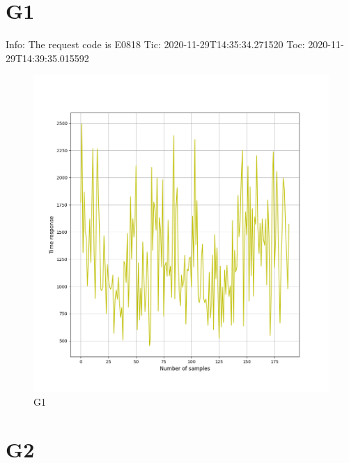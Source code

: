 \documentclass[hidelinks, 12pt, a4paper]{article}
\begin{document}



\pagebreak
\tableofcontents
\pagebreak



\section{G1}

Info:
The request code is E0818 
Tic: 2020-11-29T14:35:34.271520
Toc: 2020-11-29T14:39:35.015592

\begin{figure}[h!]
\centering
	\includegraphics[height=.38\textheight, width=\textwidth]{assets/session2/g1.png}
	\caption{G1} 
\end{figure}

\section{G2}
\end{document}

